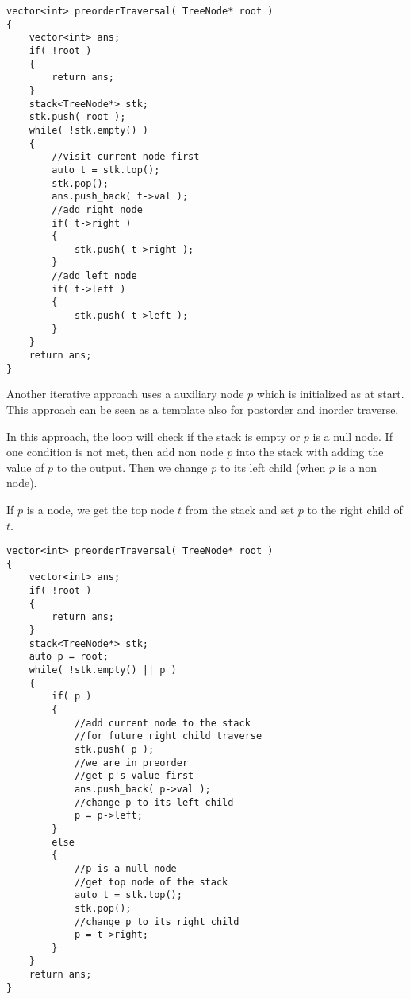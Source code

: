 \setcounter{lstlisting}{0}
\begin{lstlisting}[style=customc, caption={Iterative Approach With Stack 1}]
vector<int> preorderTraversal( TreeNode* root )
{
    vector<int> ans;
    if( !root )
    {
        return ans;
    }
    stack<TreeNode*> stk;
    stk.push( root );
    while( !stk.empty() )
    {
        //visit current node first
        auto t = stk.top();
        stk.pop();
        ans.push_back( t->val );
        //add right node
        if( t->right )
        {
            stk.push( t->right );
        }
        //add left node
        if( t->left )
        {
            stk.push( t->left );
        }
    }
    return ans;
}
\end{lstlisting}

Another iterative approach uses a auxiliary node $p$ which is initialized as  at start. This approach can be seen as a template also for postorder and inorder traverse. 

In this approach, the  loop will check if the stack is empty or $p$ is a null node. If one condition is not met, then add non  node $p$ into the stack with adding the value of $p$ to the output. Then we change $p$ to its left child (when $p$ is a non  node). 

If $p$ is a  node, we get the top node $t$ from the stack and set $p$ to the right child of $t$.


\begin{lstlisting}[style=customc, caption={Iterative Approach With Stack 2}]
vector<int> preorderTraversal( TreeNode* root )
{
    vector<int> ans;
    if( !root )
    {
        return ans;
    }
    stack<TreeNode*> stk;
    auto p = root;
    while( !stk.empty() || p )
    {
        if( p )
        {
            //add current node to the stack
            //for future right child traverse
            stk.push( p );
            //we are in preorder
            //get p's value first
            ans.push_back( p->val );
            //change p to its left child
            p = p->left;
        }
        else
        {
            //p is a null node
            //get top node of the stack
            auto t = stk.top();
            stk.pop();
            //change p to its right child
            p = t->right;
        }
    }
    return ans;
}
\end{lstlisting}

